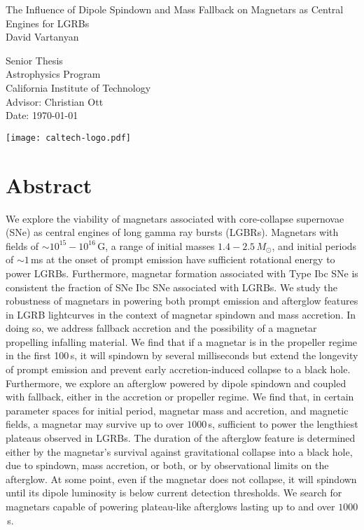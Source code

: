 \documentclass{article}
\begin{document}
\thispagestyle{empty}
\vspace*{3 cm}
\begin{center}
\Huge
The Influence of Dipole Spindown and Mass Fallback on Magnetars as Central Engines for LGRBs\\
\LARGE
\vspace{2 cm}
David Vartanyan\\
\vspace{2cm}

Senior Thesis\\
Astrophysics Program\\
California Institute of Technology\\

\vspace{5 cm}
\large
Advisor: Christian Ott\\
Date: \today
\end{center}
\centerline{\texttt{[image: caltech-logo.pdf]}}

\newpage
\thispagestyle{empty}
\mbox{}

\newpage
{\centering\section*{Abstract}}
\setcounter{page}{1}
We explore the viability of magnetars associated with core-collapse supernovae (SNe) as central engines of long gamma ray bursts (LGBRs). Magnetars with fields of $\sim 10^{15}-10^{16}$\,G, a range of initial masses $1.4-2.5\,M_{\odot}$, and initial periods of $\sim 1$\,ms at the onset of prompt emission have sufficient rotational energy to power LGRBs. Furthermore, magnetar formation associated with Type Ibc SNe is consistent the fraction of SNe Ibc SNe associated with LGRBs. We study the robustness of magnetars in powering both prompt emission and afterglow features in LGRB lightcurves in the context of magnetar spindown and mass accretion. In doing so, we address fallback accretion and the possibility of a magnetar propelling infalling material. We find that if a magnetar is in the propeller regime in the first 100\,s, it will spindown by several milliseconds but extend the longevity of prompt emission and prevent early accretion-induced collapse to a black hole. Furthermore, we explore an afterglow powered by dipole spindown and coupled with fallback, either in the accretion or propeller regime. We find that, in certain parameter spaces for initial period, magnetar mass and accretion, and magnetic fields, a magnetar may survive up to over $1000$\,s, sufficient to power the lengthiest plateaus observed in LGRBs. The duration of the afterglow feature is determined either by the magnetar's survival against gravitational collapse into a black hole, due to spindown, mass accretion, or both, or by observational limits on the afterglow. At some point, even if the magnetar does not collapse, it will spindown until its dipole luminosity is below current detection thresholds. We search for magnetars capable of powering plateau-like afterglows lasting up to and over $1000$\,s.
\end{document}
